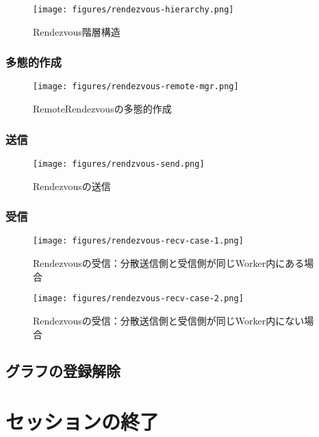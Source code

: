 \begin{content}
\begin{content}
\begin{figure}[H]
\centering
\texttt{[image: figures/rendezvous-hierarchy.png]}
\caption{Rendezvous階層構造}
 \label{fig:rendezvous-hierarchy}
\end{figure}

\subsubsection{多態的作成}

\begin{figure}[H]
\centering
\texttt{[image: figures/rendezvous-remote-mgr.png]}
\caption{RemoteRendezvousの多態的作成}
 \label{fig:rendezvous-remote-mgr}
\end{figure}

\subsubsection{送信}

\begin{figure}[H]
\centering
\texttt{[image: figures/rendzvous-send.png]}
\caption{Rendezvousの送信}
 \label{fig:rendzvous-send}
\end{figure}

\subsubsection{受信}

\begin{figure}[H]
\centering
\texttt{[image: figures/rendezvous-recv-case-1.png]}
\caption{Rendezvousの受信：分散送信側と受信側が同じWorker内にある場合}
 \label{fig:rendezvous-recv-case-1}
\end{figure}

\begin{figure}[H]
\centering
\texttt{[image: figures/rendezvous-recv-case-2.png]}
\caption{Rendezvousの受信：分散送信側と受信側が同じWorker内にない場合}
 \label{fig:rendezvous-recv-case-2}
\end{figure}

\subsection{グラフの登録解除}

\end{content}

\section{セッションの終了}


\end{content}
